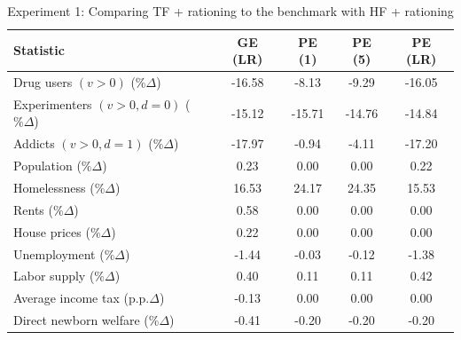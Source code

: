 \begin{table}[htbp]
\centering
\caption{Experiment 1: Comparing TF + rationing to the benchmark with HF + rationing}
\label{tab:experiment_1}
\renewcommand{\arraystretch}{1.2}
\begin{tabular}{lcccc}
\toprule
Statistic & GE (LR) & PE (1) & PE (5) & PE (LR) \\
\midrule
Drug users $(v>0)$ ($\%\Delta$)                    & -16.58 &  -8.13 &  -9.29 & -16.05 \\
Experimenters $(v>0, d=0)$ ($\%\Delta$)            & -15.12 & -15.71 & -14.76 & -14.84 \\
Addicts $(v>0, d=1)$ ($\%\Delta$)                  & -17.97 &  -0.94 &  -4.11 & -17.20 \\
Population ($\%\Delta$)                       &   0.23 &   0.00 &   0.00 &   0.22 \\
Homelessness ($\%\Delta$)                          &  16.53 &  24.17 &  24.35 &  15.53 \\
Rents ($\%\Delta$)                                 &   0.58 &   0.00 &   0.00 &   0.00 \\
House prices ($\%\Delta$)                          &   0.22 &   0.00 &   0.00 &   0.00 \\
Unemployment ($\%\Delta$)                          &  -1.44 &  -0.03 &  -0.12 &  -1.38 \\
Labor supply ($\%\Delta$)                          &   0.40 &   0.11 &   0.11 &   0.42 \\
Average income tax (p.p.$\Delta$)                  &  -0.13 &   0.00 &  0.00 & 0.00 \\
Direct newborn welfare ($\%\Delta$)                &  -0.41 &  -0.20 &  -0.20 &  -0.20 \\
\bottomrule
\bottomrule
\end{tabular}
\end{table}
